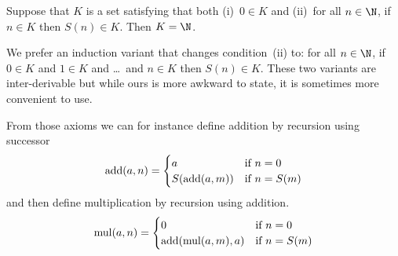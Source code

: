 \documentclass{ibl}
\begin{document}
\begin{ax}[Induction]
  Suppose that $K$ is a set satisfying that both (i)~$0\in K$
  and (ii)~for all $n\in\N$, if $n\in K$ then $S(n)\in K$.
  Then $K=\N$.
\end{ax}

We prefer an induction variant that changes
condition~(ii) to: for all $n\in\N$, 
if $0\in K$ and $1\in K$ and \ldots\ and $n\in K$ then $S(n)\in K$.
These two variants are inter-derivable but while ours is 
more awkward to state, it is sometimes more convenient to use.

From those axioms we can for instance 
define addition by recursion using successor
\begin{equation*}
  \operatorname{add}(a,n)=
  \begin{cases}
    a             &\text{if $n=0$}  \\
    S(\operatorname{add}(a,m))  &\text{if $n=S(m)$} 
  \end{cases}
\end{equation*}
and then define multiplication by recursion using addition.
\begin{equation*}
  \operatorname{mul}(a,n)=
  \begin{cases}
    0             &\text{if $n=0$}  \\
    \operatorname{add}(\operatorname{mul}(a,m),a)  &\text{if $n=S(m)$} 
  \end{cases}
\end{equation*}
\end{document}
